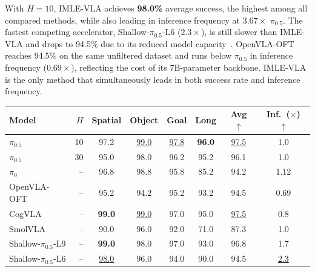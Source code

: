 \documentclass[letterpaper, 10 pt, conference]{ieeeconf}  %
\newcommand{\best}[1]{\textbf{#1}}
\newcommand{\second}[1]{\underline{#1}}
\begin{document}
With $H{=}10$, IMLE-VLA achieves \textbf{98.0\%} average success, the highest among all compared methods, while also leading in inference frequency at $3.67\times$ $\pi_{0.5}$. The fastest competing accelerator, Shallow-$\pi_{0.5}$-L6 ($2.3\times$), is still slower than IMLE-VLA and drops to 94.5\% due to its reduced model capacity~\cite{jeon2025shallow}. OpenVLA-OFT reaches 94.5\% on the same unfiltered dataset and runs below $\pi_{0.5}$ in inference frequency ($0.69\times$), reflecting the cost of its 7B-parameter backbone. IMLE-VLA is the only method that simultaneously leads in both success rate and inference frequency.


\begin{table}[t]
\centering

\vspace{0.9em}

\small
\setlength{\tabcolsep}{4pt}
\renewcommand{\arraystretch}{1.05}
\begin{tabular}{lrcccccc}

\toprule
\textbf{Model} & \textbf{$H$}
& \textbf{Spatial} & \textbf{Object} & \textbf{Goal} & \textbf{Long}
& \textbf{Avg} $\uparrow$
& \textbf{Inf.\ ($\times$)} $\uparrow$ \\
\midrule

$\pi_{0.5}$ \cite{black2025pi05} & 10 & 97.2 & \second{99.0} & \second{97.8} & \best{96.0} & \second{97.5} & 1.0 \\
$\pi_{0.5}$ \cite{black2025pi05} & 30 & 95.0 & 98.0 & 96.2 & 95.2 & 96.1 & 1.0 \\
$\pi_{0}$ \cite{black2024pi0} & -- & 96.8 & 98.8 & 95.8 & 85.2 & 94.2 & 1.12 \\

\midrule

OpenVLA-OFT \cite{kim2025openvlaoft} & -- & 95.2 & 94.2 & 95.2 & 93.2 & 94.5 & 0.69 \\

\midrule

CogVLA \cite{li2025cogvla} & -- & \best{99.0} & \second{99.0} & 97.0 & 95.0 & \second{97.5} & 0.8 \\
SmolVLA \cite{shukor2025smolvla} & -- & 90.0 & 96.0 & 92.0 & 71.0 & 87.3 & 1.0 \\

\midrule

Shallow-$\pi_{0.5}$-L9 \cite{jeon2025shallow} & -- & \best{99.0} & 98.0 & 97.0 & 93.0 & 96.8 & 1.7 \\
Shallow-$\pi_{0.5}$-L6 \cite{jeon2025shallow} & -- & \second{98.0} & 96.0 & 94.0 & 90.0 & 94.5 & \second{2.3} \\


\end{tabular}
\end{table}
\end{document}
